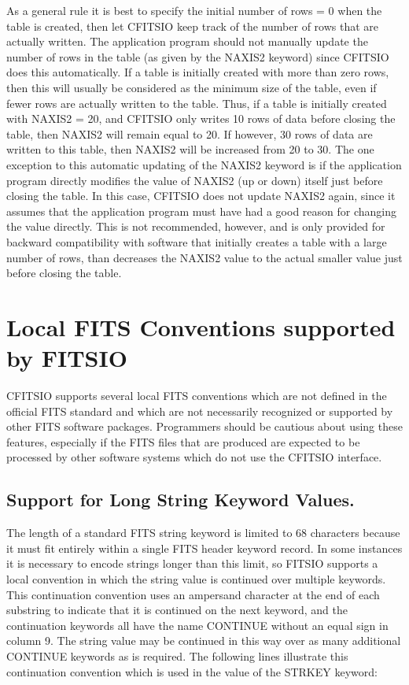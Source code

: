 \documentclass[11pt]{book}
\begin{document}
As a general rule it is best to specify the initial number of rows = 0
when the table is created, then let CFITSIO keep track of the number of
rows that are actually written.  The application program should not
manually update the number of rows in the table (as given by the NAXIS2
keyword) since CFITSIO does this automatically.  If a table is
initially created with more than zero rows, then this will usually be
considered as the minimum size of the table, even if fewer rows are
actually written to the table.  Thus, if a table is initially created
with NAXIS2 = 20, and CFITSIO only writes 10 rows of data before
closing the table, then NAXIS2 will remain equal to 20.  If however, 30
rows of data are written to this table, then NAXIS2 will be increased
from 20 to 30.  The one exception to this automatic updating of the
NAXIS2 keyword is if the application program directly modifies the
value of NAXIS2 (up or down) itself just before closing the table.  In this
case, CFITSIO does not update NAXIS2 again, since it assumes that the
application program must have had a good reason for changing the value
directly.  This is not recommended, however, and is only provided for
backward compatibility with software that initially creates a table
with a large number of rows, than decreases the NAXIS2 value to the
actual smaller value just before closing the table.


\section{Local FITS Conventions supported by FITSIO}

CFITSIO supports several local FITS conventions which are not
defined in the official FITS standard and which are not
necessarily recognized or supported by other FITS software packages.
Programmers should be cautious about using these features, especially
if the FITS files that are produced are expected to be processed by
other software systems which do not use the CFITSIO interface.


\subsection{Support for Long String Keyword Values.}

The length of a standard FITS string keyword is limited to 68
characters because it must fit entirely within a single FITS header
keyword record.  In some instances it is necessary to encode strings
longer than this limit, so FITSIO supports a local convention in which
the string value is continued over multiple keywords. This
continuation convention uses an ampersand character at the end of each
substring to indicate that it is continued on the next keyword, and the
continuation keywords all have the name CONTINUE without an equal sign
in column 9. The string value may be continued in this way over as many
additional CONTINUE keywords as is required.  The following lines
illustrate this continuation convention which is used in the value of
the STRKEY keyword:
\end{document}
